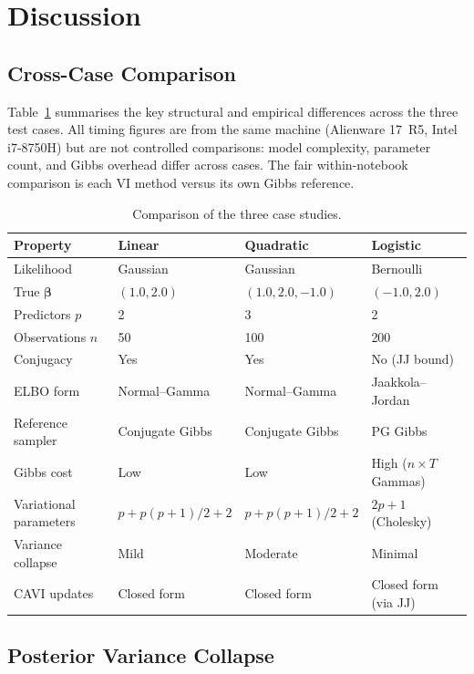\documentclass[11pt,a4paper]{article}
\begin{document}
\section{Discussion}
\label{sec:discussion}

\subsection{Cross-Case Comparison}

Table~\ref{tab:comparison} summarises the key structural and empirical differences
across the three test cases.
All timing figures are from the same machine (Alienware 17~R5, Intel i7-8750H) but
are not controlled comparisons: model complexity, parameter count, and Gibbs overhead
differ across cases.
The fair within-notebook comparison is each VI method versus its own Gibbs reference.

\begin{table}[H]
\centering
\caption{Comparison of the three case studies.}
\label{tab:comparison}
\begin{tabular}{@{}llll@{}}
\toprule
Property & Linear & Quadratic & Logistic \\
\midrule
Likelihood & Gaussian & Gaussian & Bernoulli \\
True $\bm{\beta}$ & $(1.0, 2.0)$ & $(1.0, 2.0, -1.0)$ & $(-1.0, 2.0)$ \\
Predictors $p$ & 2 & 3 & 2 \\
Observations $n$ & 50 & 100 & 200 \\
Conjugacy & Yes & Yes & No (JJ bound) \\
ELBO form & Normal--Gamma & Normal--Gamma & Jaakkola--Jordan \\
Reference sampler & Conjugate Gibbs & Conjugate Gibbs & PG Gibbs \\
Gibbs cost & Low & Low & High ($n \times T$ Gammas) \\
Variational parameters & $p + p(p+1)/2 + 2$ & $p + p(p+1)/2 + 2$ & $2p + 1$ (Cholesky) \\
Variance collapse & Mild & Moderate & Minimal \\
CAVI updates & Closed form & Closed form & Closed form (via JJ) \\
\bottomrule
\end{tabular}
\end{table}

\subsection{Posterior Variance Collapse}
\end{document}
